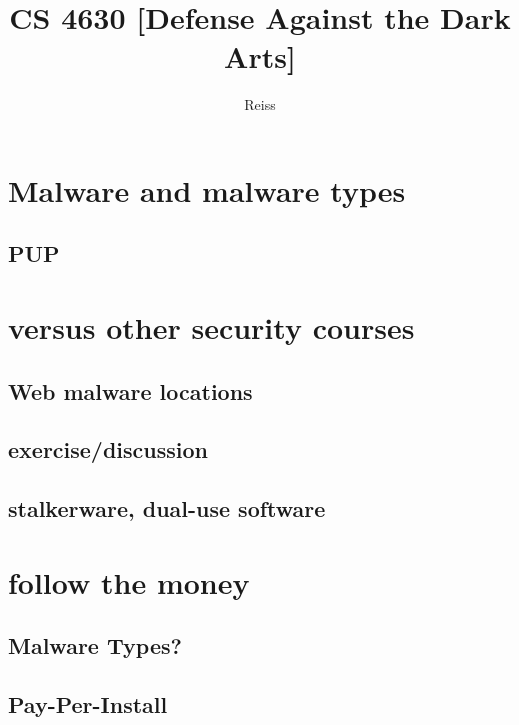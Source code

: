 \date{}
\title{CS 4630 [Defense Against the Dark Arts]}
\author{Reiss}
\date{}

\begin{frame}
    \titlepage
\end{frame}





\section{Malware and malware types}


\subsection{PUP}


\section{versus other security courses}


\subsection{Web malware locations}


\subsection{exercise/discussion}


\subsection{stalkerware, dual-use software}


\section{follow the money}


\subsection{Malware Types?}


\subsection{Pay-Per-Install}


